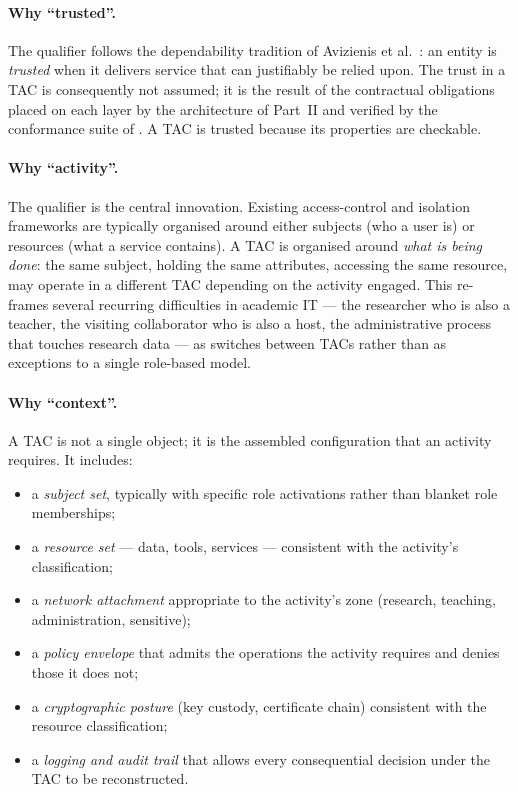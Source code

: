 \paragraph{Why ``trusted''.} The qualifier follows the
dependability tradition of Avizienis et al.~\cite{avizienis2004}:
an entity is \emph{trusted} when it delivers service that can
justifiably be relied upon. The trust in a TAC is consequently not
assumed; it is the result of the contractual obligations placed on
each layer by the architecture of Part~II and verified by the
conformance suite of . A TAC is trusted
because its properties are checkable.

\paragraph{Why ``activity''.} The qualifier is the central
innovation. Existing access-control and isolation frameworks are
typically organised around either subjects (who a user is) or
resources (what a service contains). A TAC is organised around
\emph{what is being done}: the same subject, holding the same
attributes, accessing the same resource, may operate in a
different TAC depending on the activity engaged. This re-frames
several recurring difficulties in academic IT --- the
researcher who is also a teacher, the visiting collaborator who
is also a host, the administrative process that touches research
data --- as switches between TACs rather than as exceptions to a
single role-based model.

\paragraph{Why ``context''.} A TAC is not a single object; it is
the assembled configuration that an activity requires. It
includes:

\begin{itemize}[leftmargin=1.5em,nosep]
  \item a \emph{subject set}, typically with specific role
    activations rather than blanket role memberships;
  \item a \emph{resource set} --- data, tools, services ---
    consistent with the activity's classification;
  \item a \emph{network attachment} appropriate to the activity's
    zone (research, teaching, administration, sensitive);
  \item a \emph{policy envelope} that admits the operations the
    activity requires and denies those it does not;
  \item a \emph{cryptographic posture} (key custody, certificate
    chain) consistent with the resource classification;
  \item a \emph{logging and audit trail} that allows every
    consequential decision under the TAC to be reconstructed.
\end{itemize}

